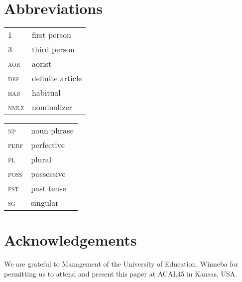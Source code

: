 \documentclass[output=paper,
modfonts
]{langscibook}
\begin{document}
\section*{Abbreviations}
\begin{tabularx}{.45\textwidth}{>{\scshape}lQ}
1	 &first person \\
3	 &third person \\
aor  &aorist    \\
def  &definite article  \\
hab  &habitual          \\
nmlz &nominalizer \\
     \end{tabularx}
\begin{tabularx}{.45\textwidth}{>{\scshape}lQ}     
np   & {noun} phrase             \\
perf & {perfective}        \\
pl   &plural            \\
poss &possessive        \\
pst  &past tense        \\
sg  &singular    \\ 
\end{tabularx}

\section*{Acknowledgements}

We are grateful to Management of the University of Education, Winneba for permitting us to attend and present this paper at ACAL45 in Kansas, USA. 

{\sloppy
\printbibliography[heading=subbibliography,notkeyword=this]
}
\end{document}
